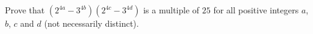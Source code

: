 Prove that $\left(2^{4a}-3^{4b}\right)\left(2^{4c}-3^{4d}\right)$ is a multiple of $25$ for all positive integers $a$, $b$, $c$ and $d$ (not necessarily distinct).
